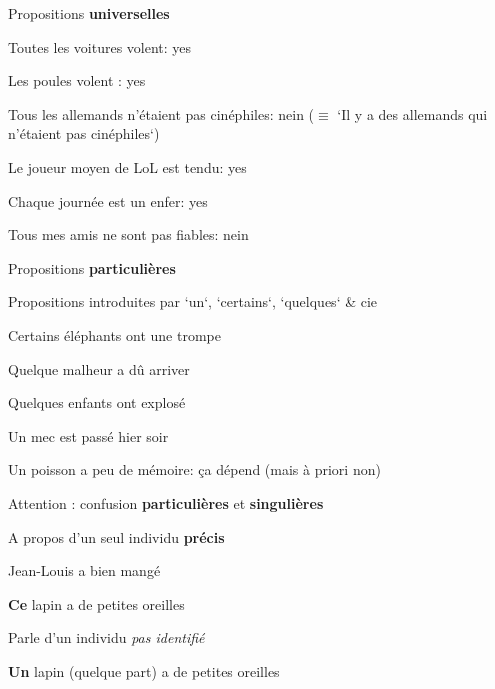 \begin{frame}
	Propositions \textbf{universelles}
	
		\begin{description}[labelindent=6pt,style=multiline,leftmargin=1.3in]
		 \setlength\itemsep{1em}
\item[Exemples ?] Toutes les voitures volent\pause : yes \pause
\item[] Les poules volent \pause : yes \pause
\item[] Tous les allemands n'étaient pas cinéphiles\pause : nein ($\equiv$ `Il y a des allemands qui n'étaient pas cinéphiles`)\pause
\item[] Le joueur moyen de LoL est tendu\pause : yes\pause
\item[] Chaque journée est un enfer\pause : yes\pause
\item[] Tous mes amis ne sont pas fiables\pause : nein
	\end{description}
\end{frame}



\begin{frame}
	Propositions \textbf{particulières}
	
		\begin{description}[labelindent=6pt,style=multiline,leftmargin=1.3in]
		 \setlength\itemsep{1em}
\item[En gros] Propositions introduites par `un`, `certains`, `quelques` \& cie\pause
\item[Exemples] Certains éléphants ont une trompe\pause
\item[] Quelque malheur a dû arriver\pause
\item[] Quelques enfants ont explosé\pause
\item[] Un mec est passé hier soir\pause
\item[] Un poisson a peu de mémoire\pause : ça dépend \pause(mais à priori non)
	\end{description}
\end{frame}


\begin{frame}
	Attention : confusion \textbf{particulières} et \textbf{singulières} 
	
		\begin{description}[labelindent=6pt,style=multiline,leftmargin=1.3in]
		 \setlength\itemsep{1em}
\item[singulière] A propos d'un seul individu \textbf{précis}\pause
\item[Exemples] Jean-Louis a bien mangé\pause
\item[] \textbf{Ce} lapin a de petites oreilles\pause
\item[particulière] Parle d'un individu \textit{pas identifié}\pause
\item[Exemple] \textbf{Un} lapin (quelque part) a de petites oreilles
	\end{description}
\end{frame}

